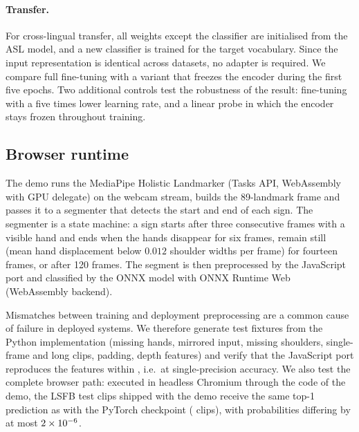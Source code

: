 \paragraph{Transfer.} For cross-lingual transfer, all weights except the classifier are
initialised from the ASL model, and a new classifier is trained for the target vocabulary. Since
the input representation is identical across datasets, no adapter is required. We compare full
fine-tuning with a variant that freezes the encoder during the first five epochs. Two additional
controls test the robustness of the result: fine-tuning with a five times lower learning rate, and
a linear probe in which the encoder stays frozen throughout training.

\subsection{Browser runtime}
\label{sec:runtime}

The demo runs the MediaPipe Holistic Landmarker (Tasks API, WebAssembly with GPU delegate) on the
webcam stream, builds the 89-landmark frame and passes it to a segmenter that detects the start
and end of each sign. The segmenter is a state machine: a sign starts after three consecutive
frames with a visible hand and ends when the hands disappear for six frames, remain still (mean
hand displacement below $0.012$ shoulder widths per frame) for fourteen frames, or after 120
frames. The segment is then preprocessed by the JavaScript port and classified by the ONNX model
with ONNX Runtime Web \citep{onnxruntime} (WebAssembly backend).

Mismatches between training and deployment preprocessing are a common cause of failure in
deployed systems. We therefore generate test fixtures from the Python implementation (missing
hands, mirrored input, missing shoulders, single-frame and long clips, padding, depth features)
and verify that the JavaScript port reproduces the features within \numJsParity{}, i.e.\ at
single-precision accuracy. We also test the complete browser path: executed in headless Chromium
through the code of the demo, the LSFB test clips shipped with the demo receive the same top-1
prediction as with the PyTorch checkpoint (\numBrowserSame{} clips), with probabilities differing
by at most $2\times10^{-6}{}$.
